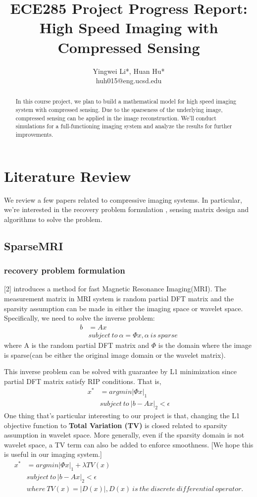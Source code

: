 \documentclass{article} %
\title{ECE285 Project Progress Report: High Speed Imaging with Compressed Sensing}
\author{
Yingwei Li*, Huan Hu* \\
\AND huh015@eng.ucsd.edu
}
\begin{document}
\maketitle

\begin{abstract}
In this course project, we plan to build a mathematical model for high speed imaging system with compressed sensing. Due to the sparseness of the underlying image, compressed sensing can be applied in the image reconstruction. We'll conduct simulations for a full-functioning imaging system and analyze the results for further improvements.
\end{abstract}

\section{Literature Review}
We review a few papers related to compressive imaging systems. In particular, we're interested in the recovery problem formulation , sensing matrix design and algorithms to solve the problem.
\subsection{SparseMRI}
\subsubsection{recovery problem formulation}
[2] introduces a method for fast Magnetic Resonance Imaging(MRI). The measurement matrix in MRI system is random partial DFT matrix and the sparsity assumption can be made in either the imaging space or wavelet space. Specifically, we need to solve the inverse problem:
\begin{align*}
b&=A x \\
&subject~to~ \alpha=\Phi x,\alpha~is~sparse
\end{align*}
where A is the random partial DFT matrix and $\Phi$ is the domain where the image is sparse(can be either the original image domain or the wavelet matrix).

This inverse problem can be solved with guarantee by L1 minimization since partial DFT matrix satisfy RIP conditions. That is,
\begin{align*}
x^*&=argmin |\Phi x|_1 \\
&subject~to~|b-Ax|_2<\epsilon
\end{align*}
One thing that's particular interesting to our project is that, changing the L1 objective function to \textbf{Total Variation (TV)} is closed related to sparsity assumption in wavelet space. More generally, even if the sparsity domain is not wavelet space, a TV term can also be added to enforce smoothness. [We hope this is useful in our imaging system.]
\begin{align*}
x^*&=argmin |\Phi x|_1+\lambda TV(x) \\
&subject~to~|b-Ax|_2<\epsilon\\
&where~TV(x)=|D(x)|, D(x)~ is~ the~discrete~differential~operator. 
\end{align*}
\end{document}
